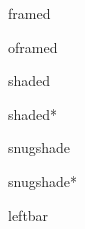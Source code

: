 \documentclass{article}
\begin{document}
\begin{framed}
    framed
\end{framed}

\begin{oframed}
    oframed
\end{oframed}

\begin{shaded}
    shaded
\end{shaded}

\begin{shaded*}
    shaded*
\end{shaded*}

\begin{snugshade}
    snugshade
\end{snugshade}

\begin{snugshade*}
    snugshade*
\end{snugshade*}

\begin{leftbar}
    leftbar
\end{leftbar}
\end{document}

